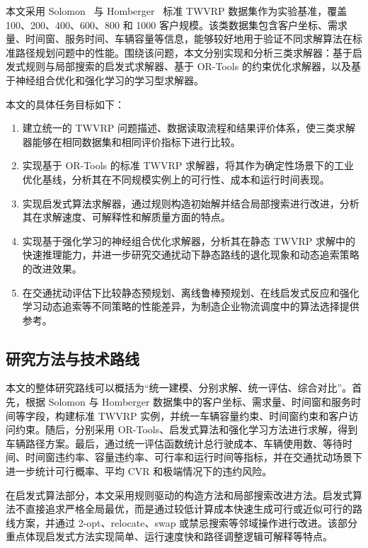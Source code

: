 \documentclass[12pt,a4paper,UTF8]{article}
\begin{document}
本文采用 Solomon~\cite{solomon1987algorithms} 与 Homberger~\cite{homberger1999two} 标准 TWVRP 数据集作为实验基准，覆盖 100、200、400、600、800 和 1000 客户规模。该类数据集包含客户坐标、需求量、时间窗、服务时间、车辆容量等信息，能够较好地用于验证不同求解算法在标准路径规划问题中的性能。围绕该问题，本文分别实现和分析三类求解器：基于启发式规则与局部搜索的启发式求解器、基于 OR-Tools 的约束优化求解器，以及基于神经组合优化和强化学习的学习型求解器。

本文的具体任务目标如下：

\begin{enumerate}
    \item 建立统一的 TWVRP 问题描述、数据读取流程和结果评价体系，使三类求解器能够在相同数据集和相同评价指标下进行比较。
    
    \item 实现基于 OR-Tools 的标准 TWVRP 求解器，将其作为确定性场景下的工业优化基线，分析其在不同规模实例上的可行性、成本和运行时间表现。
    
    \item 实现启发式算法求解器，通过规则构造初始解并结合局部搜索进行改进，分析其在求解速度、可解释性和解质量方面的特点。
    
    \item 实现基于强化学习的神经组合优化求解器，分析其在静态 TWVRP 求解中的快速推理能力，并进一步研究交通扰动下静态路线的退化现象和动态追索策略的改进效果。
    
    \item 在交通扰动评估下比较静态预规划、离线鲁棒预规划、在线启发式反应和强化学习动态追索等不同策略的性能差异，为制造企业物流调度中的算法选择提供参考。
\end{enumerate}
\subsection{研究方法与技术路线}
本文的整体研究路线可以概括为“统一建模、分别求解、统一评估、综合对比”。首先，根据 Solomon 与 Homberger 数据集中的客户坐标、需求量、时间窗和服务时间等字段，构建标准 TWVRP 实例，并统一车辆容量约束、时间窗约束和客户访问约束。随后，分别采用 OR-Tools、启发式算法和强化学习方法进行求解，得到车辆路径方案。最后，通过统一评估函数统计总行驶成本、车辆使用数、等待时间、时间窗违约率、容量违约率、可行率和运行时间等指标，并在交通扰动场景下进一步统计可行概率、平均 CVR 和极端情况下的违约风险。

在启发式算法部分，本文采用规则驱动的构造方法和局部搜索改进方法。启发式算法不直接追求严格全局最优，而是通过较低计算成本快速生成可行或近似可行的路线方案，并通过 2-opt、relocate、swap 或禁忌搜索等邻域操作进行改进。该部分重点体现启发式方法实现简单、运行速度快和路径调整逻辑可解释等特点。
\end{document}
